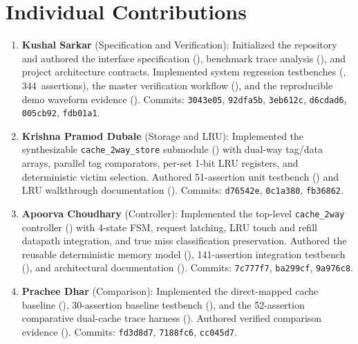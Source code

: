 \documentclass[conference]{IEEEtran}
\begin{document}
\section{Individual Contributions}

\begin{enumerate}
  \item \textbf{Kushal Sarkar} (Specification and Verification):
    Initialized the repository and authored the interface specification
    (), benchmark trace analysis
    (), and project architecture contracts.
    Implemented system regression
    testbenches (, 344~assertions),
    the master verification workflow (),
    and the reproducible demo waveform evidence
    ().
    Commits: \texttt{3043e05}, \texttt{92dfa5b}, \texttt{3eb612c},
    \texttt{d6cdad6}, \texttt{005cb92}, \texttt{fdb01a1}.

  \item \textbf{Krishna Pramod Dubale} (Storage and LRU):
    Implemented the synthesizable \texttt{cache\_2way\_store} submodule
    () with dual-way tag/data arrays,
    parallel tag comparators, per-set 1-bit LRU registers, and
    deterministic victim selection.  Authored 51-assertion unit testbench
    () and LRU walkthrough
    documentation ().
    Commits: \texttt{d76542e}, \texttt{0c1a380}, \texttt{fb36862}.

  \item \textbf{Apoorva Choudhary} (Controller):
    Implemented the top-level \texttt{cache\_2way} controller
    () with 4-state FSM, request latching,
    LRU touch and refill datapath integration, and true miss
    classification preservation.  Authored the reusable deterministic
    memory model (), 141-assertion
    integration testbench (), and
    architectural documentation ().
    Commits: \texttt{7c777f7}, \texttt{ba299cf}, \texttt{9a976c8}.

  \item \textbf{Prachee Dhar} (Comparison):
    Implemented the direct-mapped cache baseline
    (), 30-assertion baseline testbench
    (), and the 52-assertion comparative
    dual-cache trace harness ().
    Authored verified comparison evidence
    ().
    Commits: \texttt{fd3d8d7}, \texttt{7188fc6}, \texttt{cc045d7}.


\end{enumerate}
\end{document}
